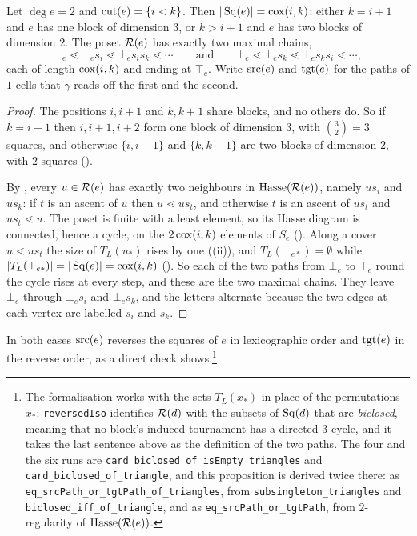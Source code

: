 \documentclass[11pt]{article}
\begin{document}
\begin{proposition}\label{prop:polygon}
  Let $\deg e = 2$ and $\operatorname{cut}(e) = \{i < k\}$. Then $|\operatorname{Sq}(e)| = \operatorname{cox}(i,k)$: either $k = i+1$ and
  $e$ has one block of dimension $3$, or $k > i+1$ and $e$ has two blocks of dimension $2$. The
  poset $\mathcal{R}(e)$ has exactly two maximal chains,
  \[
    \bot_e \lessdot \bot_es_i \lessdot \bot_es_is_k \lessdot \cdots
    \qquad\text{and}\qquad
    \bot_e \lessdot \bot_es_k \lessdot \bot_es_ks_i \lessdot \cdots,
  \]
  each of length $\operatorname{cox}(i,k)$ and ending at $\top_e$. Write $\operatorname{src}(e)$ and $\operatorname{tgt}(e)$ for the paths
  of $1$-cells that $\gamma$ reads off the first and the second.
\end{proposition}
\begin{proof}
  The positions $i, i+1$ and $k, k+1$ share blocks, and no others do. So if $k = i+1$ then
  $i, i+1, i+2$ form one block of dimension $3$, with $\binom32 = 3$ squares, and otherwise
  $\{i,i+1\}$ and $\{k,k+1\}$ are two blocks of dimension $2$, with $2$ squares
  ().

  By , every $u \in \mathcal{R}(e)$ has exactly two neighbours in
  $\mathrm{Hasse}(\mathcal{R}(e))$, namely $us_i$ and $us_k$: if $t$ is an ascent of $u$ then
  $u \lessdot us_t$, and otherwise $t$ is an ascent of $us_t$ and $us_t \lessdot u$. The poset is
  finite with a least element, so its Hasse diagram is connected, hence a cycle, on the
  $2\operatorname{cox}(i,k)$ elements of $S_e$ (). Along a cover $u \lessdot us_t$ the
  size of $T_L(u_*)$ rises by one ((ii)), and $T_L(\bot_{e*}) = \emptyset$ while
  $|T_L(\top_{e*})| = |\operatorname{Sq}(e)| = \operatorname{cox}(i,k)$ (). So each of the
  two paths from $\bot_e$ to $\top_e$ round the cycle rises at every step, and these are the two
  maximal chains. They leave $\bot_e$ through $\bot_es_i$ and $\bot_es_k$, and the letters
  alternate because the two edges at each vertex are labelled $s_i$ and $s_k$.
\end{proof}

In both cases $\operatorname{src}(e)$ reverses the squares of $e$ in lexicographic order and $\operatorname{tgt}(e)$ in the
reverse order, as a direct check shows.\footnote{The formalisation \cite{Cubical} works with the
sets $T_L(x_*)$ in place of the permutations $x_*$: \texttt{reversedIso} identifies $\mathcal{R}(d)$
with the subsets of $\operatorname{Sq}(d)$ that are \emph{biclosed}, meaning that no block's induced tournament
has a directed $3$-cycle, and it takes the last sentence above as the definition of the two paths.
The four and the six runs are \texttt{card\_biclosed\_of\_isEmpty\_triangles} and
\texttt{card\_biclosed\_of\_triangle}, and this proposition is derived twice there: as
\texttt{eq\_srcPath\_or\_tgtPath\_of\_triangles}, from \texttt{subsingleton\_triangles} and
\texttt{biclosed\_iff\_of\_triangle}, and as \texttt{eq\_srcPath\_or\_tgtPath}, from
$2$-regularity of $\mathrm{Hasse}(\mathcal{R}(e))$.}
\end{document}

